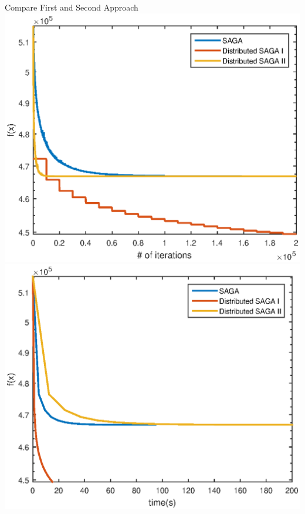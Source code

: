 \begin{frame}{Compare First and Second Approach}
	\medskip
	\medskip
	\medskip
	\medskip
	\medskip
	\medskip
	\medskip
	\centering
	\includegraphics[scale=0.4]{compare.eps}
	\includegraphics[scale=0.4]{compare2.eps} 
\end{frame}
